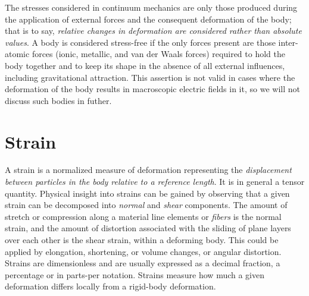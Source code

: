 \documentclass[letterpaper,10pt,english]{sphinxmanual}
\begin{document}
The stresses considered in continuum mechanics are only those produced during the application of external forces and the consequent deformation of the body; that is to say, \emph{relative changes in deformation are considered rather than absolute values}. A body is considered stress-free if the only forces present are those inter-atomic forces (ionic, metallic, and van der Waals forces) required to hold the body together and to keep its shape in the absence of all external influences, including gravitational attraction. This assertion is not valid in cases where the deformation of the body results in macroscopic electric fields in it, so we will not discuss such bodies in futher.


\section{Strain}
\label{general:strain}\label{general:theorstrain}
A strain is a normalized measure of deformation representing the \emph{displacement between particles in the body relative to a reference length}. It is in general a tensor quantity. Physical insight into strains can be gained by observing that a given strain can be decomposed into \emph{normal} and \emph{shear} components. The amount of stretch or compression along a material line elements or \emph{fibers} is the normal strain, and the amount of distortion associated with the sliding of plane layers over each other is the shear strain, within a deforming body. This could be applied by elongation, shortening, or volume changes, or angular distortion. Strains are dimensionless and are usually expressed as a decimal fraction, a percentage or in parts-per notation. Strains measure how much a given deformation differs locally from a rigid-body deformation.
\end{document}
